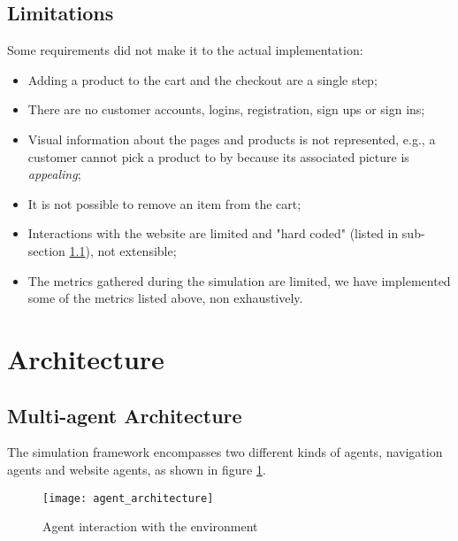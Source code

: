 \subsection{Limitations}

Some requirements did not make it to the actual implementation:

\begin{itemize}
    \item Adding a product to the cart and the checkout are a single step;
    \item There are no customer accounts, logins, registration, sign ups or 
    sign ins;
    \item Visual information about the pages and products is not represented, 
    e.g., a customer cannot pick a product to by because its associated 
    picture is \textit{appealing};
    \item It is not possible to remove an item from the cart;
    \item Interactions with the website are limited and "hard coded" (listed 
    in sub-section \ref{ssec:multiagents}), not extensible;
    \item The metrics gathered during the simulation are limited, we have 
    implemented some of the metrics listed above, non exhaustively.
\end{itemize}

\section{Architecture}

\subsection{Multi-agent Architecture}\label{ssec:multiagents}

The simulation framework encompasses two different kinds of agents, navigation 
agents and website agents, as shown in figure \ref{fig:agent_arch}.

\begin{figure}[!h]
    \begin{center}
        \leavevmode
        \texttt{[image: agent\_architecture]}
        \caption{Agent interaction with the environment}
        \label{fig:agent_arch}
    \end{center}
\end{figure}

